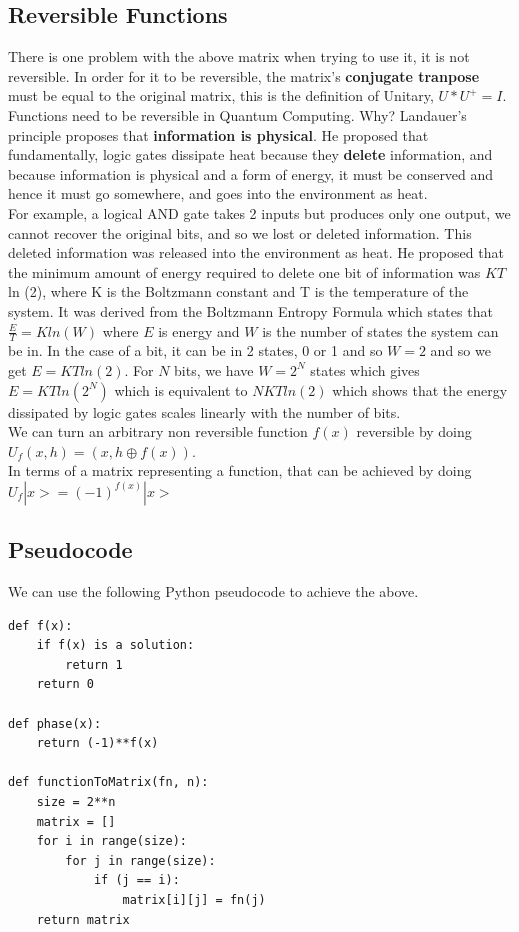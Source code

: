 \documentclass[11pt]{article} %
\begin{document}
\subsection{Reversible Functions}{}
There is one problem with the above matrix when trying to use it, it is not reversible. In order for it to be reversible, the matrix's \textbf{conjugate tranpose} must be equal to the original matrix, this is the definition of Unitary, $U*U^{+} = I$. Functions need to be reversible in Quantum Computing. Why? Landauer's principle proposes that \textbf{information is physical}. He proposed that fundamentally, logic gates dissipate heat because they \textbf{delete} information, and because information is physical and a form of energy, it must be conserved and hence it must go somewhere, and goes into the environment as heat. \\

\noindent For example, a logical AND gate takes 2 inputs but produces only one output, we cannot recover the original bits, and so we lost or deleted information. This deleted information was released into the environment as heat. He proposed that the minimum amount of energy required to delete one bit of information was $K T$ ln (2), where K is the Boltzmann constant and T is the temperature of the system. It was derived from the Boltzmann Entropy Formula which states that $\frac{E}{T} = K ln(W)$ where $E$ is energy and $W$ is the number of states the system can be in. In the case of a bit, it can be in 2 states, 0 or 1 and so $W = 2$ and so we get $E = K T ln(2)$. For $N$ bits, we have $W = 2^{N}$ states which gives $E = K T ln(2^N)$ which is equivalent to $N K T ln (2)$ which shows that the energy dissipated by logic gates scales linearly with the number of bits.\\

\noindent We can turn an arbitrary non reversible function $f(x)$ reversible by doing $U_{f} (x, h) = (x, h \oplus  f(x))$. \\

\noindent In terms of a matrix representing a function, that can be achieved by doing $U_f |x> = (-1)^{f(x)}|x>$


 \subsection{Pseudocode}{}
We can use the following Python pseudocode to achieve the above.
\begin{Verbatim}[tabsize=4]
def f(x):	
	if f(x) is a solution:
		return 1
	return 0

def phase(x):
	return (-1)**f(x)

def functionToMatrix(fn, n):
	size = 2**n
	matrix = []
	for i in range(size):
		for j in range(size):
			if (j == i):
				matrix[i][j] = fn(j)
	return matrix
	
\end{Verbatim} 
\end{document}
